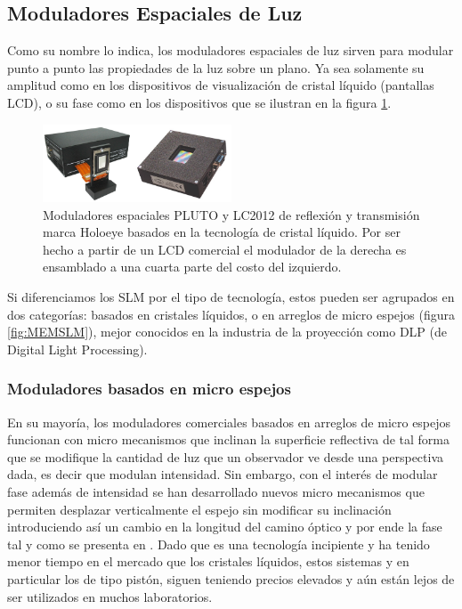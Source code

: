 \subsection{Moduladores Espaciales de Luz}

Como su nombre lo indica, los moduladores espaciales de luz sirven
para modular punto a punto las propiedades de la luz sobre un
plano. Ya sea solamente su amplitud como en los dispositivos de
visualización de cristal líquido (pantallas LCD), o su fase como en
los dispositivos que se ilustran en la figura \ref{fig:LCDSLM}.
\begin{figure}[h!]
\centering
    \includegraphics[width=0.5\textwidth]{LCDSLM.png}
\caption[Comparación entre TN-SLM]{Moduladores espaciales PLUTO y LC2012 de reflexión y
  transmisión marca Holoeye basados en la tecnología de cristal
  líquido. Por ser hecho a partir de un LCD comercial el modulador de
  la derecha es ensamblado a una cuarta parte del costo del izquierdo.}
\label{fig:LCDSLM}
\end{figure}

Si diferenciamos los SLM por el tipo de tecnología, estos pueden ser
agrupados en dos categorías: basados en cristales líquidos, o en
arreglos de micro espejos (figura \ref{fig:MEMSLM}), mejor 
conocidos en la industria de la proyección como DLP (de Digital Light
Processing).  
\subsubsection{Moduladores basados en micro espejos}
En su mayoría, los moduladores comerciales basados en arreglos de micro
espejos funcionan con micro mecanismos que inclinan la superficie
reflectiva de tal forma que se modifique la cantidad de luz que un
observador ve desde una perspectiva dada, es decir que modulan
intensidad. Sin embargo, con el interés de modular fase además de
intensidad se han desarrollado nuevos micro mecanismos que
permiten desplazar verticalmente el espejo sin modificar su
inclinación introduciendo así un cambio en la longitud del camino
óptico y por ende la fase tal y como se presenta en . Dado que es una tecnología incipiente y ha tenido
menor tiempo en el mercado que los cristales líquidos, estos sistemas
y en particular los de tipo pistón, siguen teniendo precios elevados y
aún están lejos de ser utilizados en muchos laboratorios.

